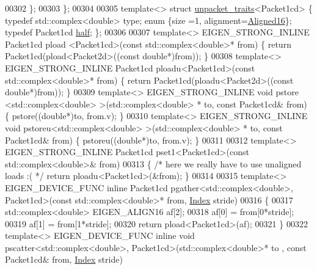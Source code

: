 \begin{DoxyCode}
00302   \};
00303 \};
00304 
00305 \textcolor{keyword}{template}<> \textcolor{keyword}{struct }\hyperlink{struct_eigen_1_1internal_1_1unpacket__traits}{unpacket\_traits}<Packet1cd> \{ \textcolor{keyword}{typedef} std::complex<double> type; \textcolor{keyword}{enum} \{size
      =1, alignment=\hyperlink{group__enums_gga45fe06e29902b7a2773de05ba27b47a1af8e2bf74b04c02199f62c5e3c06dbfcc}{Aligned16}\}; \textcolor{keyword}{typedef} Packet1cd \hyperlink{struct_eigen_1_1half}{half}; \};
00306 
00307 \textcolor{keyword}{template}<> EIGEN\_STRONG\_INLINE Packet1cd pload <Packet1cd>(\textcolor{keyword}{const} std::complex<double>* from) \{ \textcolor{keywordflow}{return} 
      Packet1cd(pload<Packet2d>((\textcolor{keyword}{const} \textcolor{keywordtype}{double}*)from)); \}
00308 \textcolor{keyword}{template}<> EIGEN\_STRONG\_INLINE Packet1cd ploadu<Packet1cd>(\textcolor{keyword}{const} std::complex<double>* from) \{ \textcolor{keywordflow}{return} 
      Packet1cd(ploadu<Packet2d>((\textcolor{keyword}{const} \textcolor{keywordtype}{double}*)from)); \}
00309 \textcolor{keyword}{template}<> EIGEN\_STRONG\_INLINE \textcolor{keywordtype}{void} pstore <std::complex<double> >(std::complex<double> *   to, \textcolor{keyword}{const} 
      Packet1cd& from) \{ pstore((\textcolor{keywordtype}{double}*)to, from.v); \}
00310 \textcolor{keyword}{template}<> EIGEN\_STRONG\_INLINE \textcolor{keywordtype}{void} pstoreu<std::complex<double> >(std::complex<double> *   to, \textcolor{keyword}{const} 
      Packet1cd& from) \{ pstoreu((\textcolor{keywordtype}{double}*)to, from.v); \}
00311 
00312 \textcolor{keyword}{template}<> EIGEN\_STRONG\_INLINE Packet1cd pset1<Packet1cd>(\textcolor{keyword}{const} std::complex<double>&  from)
00313 \{ \textcolor{comment}{/* here we really have to use unaligned loads :( */} \textcolor{keywordflow}{return} ploadu<Packet1cd>(&from); \}
00314 
00315 \textcolor{keyword}{template}<> EIGEN\_DEVICE\_FUNC \textcolor{keyword}{inline} Packet1cd pgather<std::complex<double>, Packet1cd>(\textcolor{keyword}{const} 
      std::complex<double>* from, \hyperlink{namespace_eigen_a62e77e0933482dafde8fe197d9a2cfde}{Index} stride)
00316 \{
00317   std::complex<double> EIGEN\_ALIGN16 af[2];
00318   af[0] = from[0*stride];
00319   af[1] = from[1*stride];
00320   \textcolor{keywordflow}{return} pload<Packet1cd>(af);
00321 \}
00322 \textcolor{keyword}{template}<> EIGEN\_DEVICE\_FUNC \textcolor{keyword}{inline} \textcolor{keywordtype}{void} pscatter<std::complex<double>, Packet1cd>(std::complex<double>* to
      , \textcolor{keyword}{const} Packet1cd& from, \hyperlink{namespace_eigen_a62e77e0933482dafde8fe197d9a2cfde}{Index} stride)

\end{DoxyCode}
